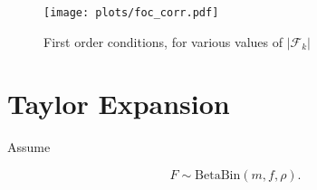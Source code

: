 \documentclass[american, abstract=on]{scrartcl}
\newcommand{\F}{\mathcal{F}}
\newcommand{\E}{\mathbb{E}}
\newcommand{\abs}[1]{\left\lvert#1\right\rvert}
\begin{document}
\begin{figure}[H]
  \centering
  \texttt{[image: plots/foc\_corr.pdf]} 
  \caption{First order conditions, for various values of $\abs{\F_k}$}
  \label{fig:vert_foc_cor}
\end{figure}

\fi

\iffalse

\subsubsection{Social planner}

The social planner problem has a Bellman formulation. Let $G$ be such that  

\begin{equation}
  g_{i+1} = G(s, g_i).
\end{equation}

Then

\begin{equation}
  V(g) = \max_{s \in \mathbb{Z}} \left\{ m \pi \ \E_{\F_i} \Big[ p(s) \Big] - \kappa \ s + \E_{\F_i}\Big[  V\left(G(s, g)\right)\Big] \right\}
\end{equation}

The social optimum $\tilde{s}_s$ satisfies the first order condition

\begin{equation}
  m \pi \ \E_{\F_i} \left[ \frac{\partial p}{\partial s}\left(\tilde{s}_s\right) \right] = \kappa - \E_{\F_i} \left[ V'(G(\tilde{s}_s, g)) \ \frac{\partial G}{\partial s}(\tilde{s}_s, g)\right].
\end{equation}

where, for a given $f$,

\begin{equation}
  V'(g(f)) = m \pi \ p(\tilde{s}_s, f) + V(G(\tilde{s}_s, g(f))) + \E_{\F_i}\left[ V'\left(G(\tilde{s}_s, g(f))\right) \  \frac{\partial G}{\partial g}(\tilde{s}_s, g(f)) \right].
\end{equation}

\fi

\newpage
\printbibliography

\newpage
\appendix
\section{Taylor Expansion}

Assume 

\begin{equation}
  F \sim \text{BetaBin}(m, f, \rho).
\end{equation}
\end{document}
